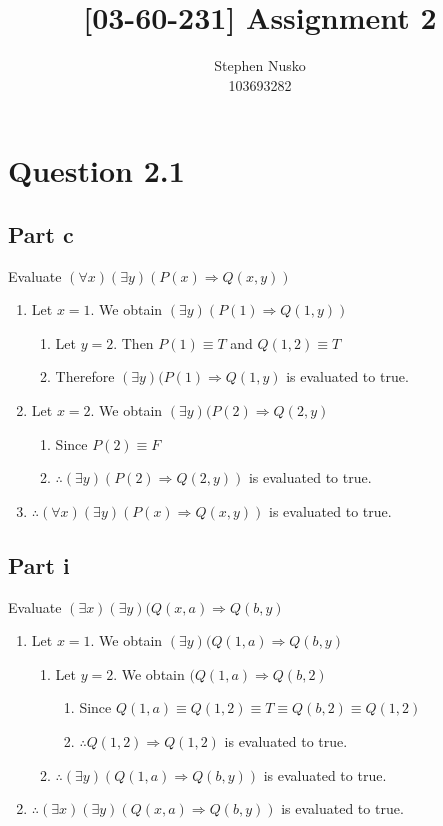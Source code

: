 \documentclass{article}
\title{[03-60-231] Assignment 2}
\author{Stephen Nusko \\ 103693282}
\begin{document}
	\thispagestyle{empty}
	\maketitle	
	\section{Question 2.1}
		\subsection{Part c}
			Evaluate $(\forall x)(\exists y)(P(x) \Rightarrow Q(x, y))$
			\begin{enumerate}
				\item Let $x = 1$. We obtain $(\exists y)(P(1) \Rightarrow Q(1, y))$ 
				\begin{enumerate}
					\item Let $y = 2$. Then $P(1) \equiv T$ and $Q(1, 2) \equiv T$
					\item Therefore $(\exists y)(P(1) \Rightarrow Q(1, y)$ is evaluated to true.
				\end{enumerate}
				\item Let $x = 2$. We obtain $(\exists y)(P(2) \Rightarrow Q(2, y)$
				\begin{enumerate}
					\item Since $P(2) \equiv F$
					\item $\therefore (\exists y)(P(2) \Rightarrow Q(2, y))$ is evaluated to true.
				\end{enumerate}
				\item $\therefore (\forall x)(\exists y)(P(x) \Rightarrow Q(x, y))$ is evaluated to true.
			\end{enumerate}
		\subsection{Part i}
			Evaluate $(\exists x)(\exists y)(Q(x, a) \Rightarrow Q(b, y)$
			\begin{enumerate}
				\item Let $x = 1$. We obtain $(\exists y)(Q(1, a) \Rightarrow Q(b, y)$
				\begin{enumerate}
					\item Let $y = 2$. We obtain $(Q(1, a) \Rightarrow Q(b, 2)$
					\begin{enumerate}
						\item Since $Q(1, a) \equiv Q(1, 2) \equiv T \equiv Q(b, 2) \equiv Q(1, 2)$
						\item $\therefore Q(1, 2) \Rightarrow Q(1, 2)$ is evaluated to true.
					\end{enumerate}
					\item $\therefore (\exists y)(Q(1, a) \Rightarrow Q(b, y))$ is evaluated to true.
				\end{enumerate}
				\item $\therefore (\exists x)(\exists y)(Q(x, a) \Rightarrow Q(b, y))$ is evaluated to true.
			\end{enumerate}
\end{document}
